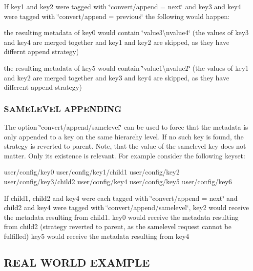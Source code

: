 If key1 and key2 were tagged with \char`\"{}convert/append = next\char`\"{} and key3 and key4 were tagged with \char`\"{}convert/append = previous\char`\"{} the following would happen\+:
\begin{DoxyItemize}
\item the resulting metadata of key0 would contain \char`\"{}value3\textbackslash{}nvalue4\char`\"{} (the values of key3 and key4 are merged together and key1 and key2 are skipped, as they have differnt append strategy)
\item the resulting metadata of key5 would contain \char`\"{}value1\textbackslash{}nvalue2\char`\"{} (the values of key1 and key2 are merged together and key3 and key4 are skipped, as they have different append strategy)
\end{DoxyItemize}

\subsubsection*{S\+A\+M\+E\+L\+E\+V\+E\+L A\+P\+P\+E\+N\+D\+I\+N\+G}

The option \char`\"{}convert/append/samelevel\char`\"{} can be used to force that the metadata is only appended to a key on the same hierarchy level. If no such key is found, the strategy is reverted to parent. Note, that the value of the samelevel key does not matter. Only its existence is relevant. For example consider the following keyset\+: \begin{DoxyVerb}                            user/config/key0
                            user/config/key1/child1
                            user/config/key2
                            user/config/key3/child2
                            user/config/key4
                            user/config/key5
                            user/config/key6
\end{DoxyVerb}


If child1, child2 and key4 were each tagged with \char`\"{}convert/append = next\char`\"{} and child2 and key4 were tagged with \char`\"{}convert/append/samelevel\char`\"{}, key2 would receive the metadata resulting from child1. key0 would receive the metadata resulting from child2 (strategy reverted to parent, as the samelevel request cannot be fulfilled) key5 would receive the metadata resulting from key4

\subsection*{R\+E\+A\+L W\+O\+R\+L\+D E\+X\+A\+M\+P\+L\+E}

